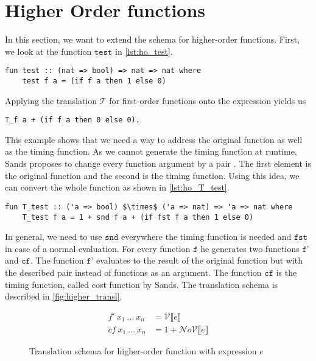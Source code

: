 
\section{Higher Order functions} \label{chapter:higher_order}

In this section, we want to extend the schema for higher-order functions.
First, we look at the function $\texttt{test}$ in \autoref{lst:ho_test}.
\begin{lstlisting}[language=isabelle,mathescape=true,label=lst:ho_test,caption=Example function]
  fun test :: (nat => bool) => nat => nat where
    test f a = (if f a then 1 else 0)
\end{lstlisting}

\pagebreak
Applying the translation $\mathcal{T}$ for first-order functions onto the expression yields us
\begin{lstlisting}[language=isabelle,mathescape=true]
  T_f a + (if f a then 0 else 0).
\end{lstlisting}

This example shows that we need a way to address the original function as well as the timing function.
As we cannot generate the timing function at runtime, Sands proposes to change every function argument by a pair \parencite{sands}.
The first element is the original function and the second is the timing function.
Using this idea, we can convert the whole function as shown in \autoref{lst:ho_T_test}.
\begin{lstlisting}[language=isabelle,mathescape=true,label=lst:ho_T_test,caption=Timing function of example function]
  fun T_test :: ('a => bool) $\times$ ('a => nat) => 'a => nat where
    T_test f a = 1 + snd f a + (if fst f a then 1 else 0)
\end{lstlisting}
In general, we need to use $\texttt{snd}$ everywhere the timing function is needed and $\texttt{fst}$ in case of a normal evaluation.
For every function $\texttt{f}$ he generates two functions $\texttt{f'}$ and $\texttt{cf}$.
The function $\texttt{f'}$ evaluates to the result of the original function but with the described pair instead of functions as an argument.
The function $\texttt{cf}$ is the timing function, called cost function by Sands.
The translation schema is described in \autoref{fig:higher_transl}.
\begin{figure}
  \begin{align*}
  f'\ x_{1}\ \dots\ x_{n} &= \mathcal{V}\llbracket e \rrbracket \\
  cf\ x_{1}\ \dots\ x_{n} &= 1 + \mathcal{N}o\mathcal{V}\llbracket e \rrbracket
  \end{align*}
  \caption{Translation schema for higher-order function with expression $e$}
  \label{fig:higher_transl}
\end{figure}


